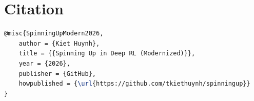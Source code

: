 \documentclass{article}
\begin{document}
\section{Citation}
\begin{lstlisting}[language=TeX]
@misc{SpinningUpModern2026,
    author = {Kiet Huynh},
    title = {{Spinning Up in Deep RL (Modernized)}},
    year = {2026},
    publisher = {GitHub},
    howpublished = {\url{https://github.com/tkiethuynh/spinningup}}
}
\end{lstlisting}
\end{document}
